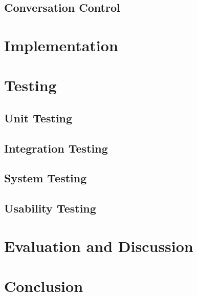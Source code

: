 \documentclass[11pt]{article}
\begin{document}
\subsection{Conversation Control} \label{conversation-control}

%

\section{Implementation} \label{implementation}

\section{Testing} \label{testing}

\subsection{Unit Testing} \label{unit-testing}

\subsection{Integration Testing} \label{integration-testing}

\subsection{System Testing} \label{system-testing}

\subsection{Usability Testing} \label{usability-testing}


\section{Evaluation and Discussion} \label{evaluation-discussion}

\section{Conclusion} \label{conclusion}


%
 
\end{document}

